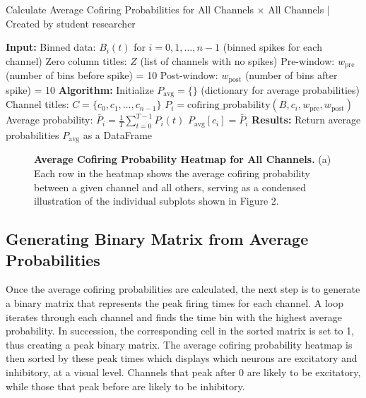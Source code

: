 \documentclass{article} %
\begin{document}
\begin{singlespace}
    \begin{algorithm}
    \caption{Calculate Average Cofiring Probabilities for All Channels \(\times\) All Channels | Created by student researcher}
        \begin{algorithmic}[1]
            \State \textbf{Input:}
            \State  Binned data: $B_{i}(t)$ for $i = 0, 1, \ldots, n-1$ (binned spikes for each channel)
            \State  Zero column titles: $Z$ (list of channels with no spikes)
            \State  Pre-window: $w_{\text{pre}}$ (number of bins before spike) = 10
            \State  Post-window: $w_{\text{post}}$ (number of bins after spike) = 10
            \State
            \State \textbf{Algorithm:}
            \State  Initialize $P_{\text{avg}} = \{\}$ (dictionary for average probabilities)
            \State  Channel titles: $C = \{c_{0}, c_{1}, \ldots, c_{n-1}\}$
                    \State $P_{i} = \text{cofiring\_probability}(B, c_{i}, w_{\text{pre}}, w_{\text{post}})$
                    \State Average probability: $\bar{P}_{i} = \frac{1}{T} \sum_{t=0}^{T-1} P_{i}(t)$
                    \State $P_{\text{avg}}[c_{i}] = \bar{P}_{i}$
                \EndIf
            \EndFor
            \State
            \State \textbf{Results:}
            \State  Return average probabilities $P_{\text{avg}}$ as a DataFrame
        \end{algorithmic}
    \end{algorithm}
\end{singlespace}



\begin{figure}
    \centering
    \caption{\textbf{Average Cofiring Probability Heatmap for All Channels.} (a) Each row in the heatmap shows the average cofiring probability between a given channel and all others, serving as a condensed illustration of the individual subplots shown in Figure 2.}
\end{figure}



\subsection{Generating Binary Matrix from Average Probabilities}
Once the average cofiring probabilities are calculated, the next step is to generate a binary matrix that represents the peak firing times for each channel. A loop iterates through each channel and finds the time bin with the highest average probability. In succession, the corresponding cell in the sorted matrix is set to 1, thus creating a peak binary matrix. The average cofiring probability heatmap is then sorted by these peak times which displays which neurons are excitatory and inhibitory, at a visual level. Channels that peak after 0 are likely to be excitatory, while those that peak before are likely to be inhibitory.
\end{document}
